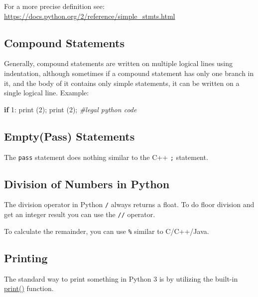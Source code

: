 \documentclass[
]{article}
\newenvironment{Shaded}{}{}
\newcommand{\BuiltInTok}[1]{#1}
\newcommand{\CommentTok}[1]{\textcolor[rgb]{0.38,0.63,0.69}{\textit{#1}}}
\newcommand{\ControlFlowTok}[1]{\textcolor[rgb]{0.00,0.44,0.13}{\textbf{#1}}}
\newcommand{\DecValTok}[1]{\textcolor[rgb]{0.25,0.63,0.44}{#1}}
\newcommand{\NormalTok}[1]{#1}
\newcommand{\OperatorTok}[1]{\textcolor[rgb]{0.40,0.40,0.40}{#1}}
\begin{document}
For a more precise definition see:
\url{https://docs.python.org/2/reference/simple_stmts.html}

\hypertarget{compound-statements}{%
\subsection{Compound Statements}\label{compound-statements}}

Generally, compound statements are written on multiple logical lines
using indentation, although sometimes if a compound statement has only
one branch in it, and the body of it contains only simple statements, it
can be written on a single logical line. Example:

\begin{Shaded}
\begin{Highlighting}[]
\ControlFlowTok{if} \DecValTok{1}\NormalTok{: }\BuiltInTok{print}\NormalTok{ (}\DecValTok{2}\NormalTok{)}\OperatorTok{;} \BuiltInTok{print}\NormalTok{ (}\DecValTok{2}\NormalTok{)}\OperatorTok{;} \CommentTok{\#legal python code}
\end{Highlighting}
\end{Shaded}

\hypertarget{emptypass-statements}{%
\subsection{Empty(Pass) Statements}\label{emptypass-statements}}

The \texttt{pass} statement does nothing similar to the C++ \texttt{;}
statement.

\hypertarget{division-of-numbers-in-python}{%
\subsection{Division of Numbers in
Python}\label{division-of-numbers-in-python}}

The division operator in Python \texttt{/} always returns a float. To do
floor division and get an integer result you can use the \texttt{//}
operator.

To calculate the remainder, you can use \texttt{\%} similar to
C/C++/Java.

\hypertarget{printing}{%
\subsection{Printing}\label{printing}}

The standard way to print something in Python 3 is by utilizing the
built-in
\href{https://docs.python.org/3/library/functions.html\#print}{print()}
function.
\end{document}
